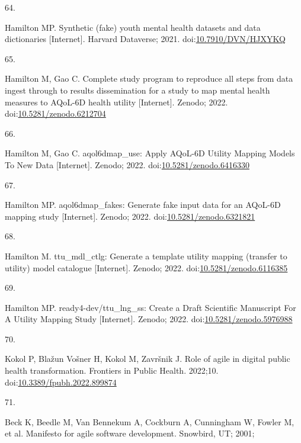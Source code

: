 \documentclass[
]{article}
\newlength{\cslhangindent}
\newlength{\csllabelwidth}
\newlength{\cslentryspacingunit} %
\newenvironment{CSLReferences}[2] %
 {%
  \setlength{\parindent}{0pt}
  \ifodd #1
  \let\oldpar\par
  \def\par{\hangindent=\cslhangindent\oldpar}
  \fi
  \setlength{\parskip}{#2\cslentryspacingunit}
 }%
 {}
\newcommand{\CSLLeftMargin}[1]{\parbox[t]{\csllabelwidth}{#1}}
\newcommand{\CSLRightInline}[1]{\parbox[t]{\linewidth - \csllabelwidth}{#1}\break}
\begin{document}
\begin{CSLReferences}{0}{0}
\leavevmode{}%
\CSLLeftMargin{64. }%
\CSLRightInline{Hamilton MP. {Synthetic (fake) youth mental health datasets and data dictionaries} {[}Internet{]}. Harvard Dataverse; 2021. doi:\href{https://doi.org/10.7910/DVN/HJXYKQ}{10.7910/DVN/HJXYKQ}}

\leavevmode{}%
\CSLLeftMargin{65. }%
\CSLRightInline{Hamilton M, Gao C. {Complete study program to reproduce all steps from data ingest through to results dissemination for a study to map mental health measures to AQoL-6D health utility} {[}Internet{]}. Zenodo; 2022. doi:\href{https://doi.org/10.5281/zenodo.6212704}{10.5281/zenodo.6212704}}

\leavevmode{}%
\CSLLeftMargin{66. }%
\CSLRightInline{Hamilton M, Gao C. {aqol6dmap\_use: Apply AQoL-6D Utility Mapping Models To New Data} {[}Internet{]}. Zenodo; 2022. doi:\href{https://doi.org/10.5281/zenodo.6416330}{10.5281/zenodo.6416330}}

\leavevmode{}%
\CSLLeftMargin{67. }%
\CSLRightInline{Hamilton MP. {aqol6dmap\_fakes: Generate fake input data for an AQoL-6D mapping study} {[}Internet{]}. Zenodo; 2022. doi:\href{https://doi.org/10.5281/zenodo.6321821}{10.5281/zenodo.6321821}}

\leavevmode{}%
\CSLLeftMargin{68. }%
\CSLRightInline{Hamilton M. {ttu\_mdl\_ctlg: Generate a template utility mapping (transfer to utility) model catalogue} {[}Internet{]}. Zenodo; 2022. doi:\href{https://doi.org/10.5281/zenodo.6116385}{10.5281/zenodo.6116385}}

\leavevmode{}%
\CSLLeftMargin{69. }%
\CSLRightInline{Hamilton MP. {ready4-dev/ttu\_lng\_ss: Create a Draft Scientific Manuscript For A Utility Mapping Study} {[}Internet{]}. Zenodo; 2022. doi:\href{https://doi.org/10.5281/zenodo.5976988}{10.5281/zenodo.5976988}}

\leavevmode{}%
\CSLLeftMargin{70. }%
\CSLRightInline{Kokol P, Blažun Vošner H, Kokol M, Završnik J. Role of agile in digital public health transformation. Frontiers in Public Health. 2022;10. doi:\href{https://doi.org/10.3389/fpubh.2022.899874}{10.3389/fpubh.2022.899874}}

\leavevmode{}%
\CSLLeftMargin{71. }%
\CSLRightInline{Beck K, Beedle M, Van Bennekum A, Cockburn A, Cunningham W, Fowler M, et al. Manifesto for agile software development. Snowbird, UT; 2001; }


\end{CSLReferences}
\end{document}
